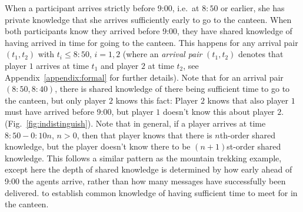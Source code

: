 When a participant arrives strictly before 9:00, i.e.\ at $8{:}50$ or earlier, she has private knowledge that she arrives sufficiently early to go to the canteen. When both participants know they arrived before 9:00, they have shared knowledge of having arrived in time for going to the canteen. This happens for any arrival pair $(t_1,t_2)$ with $t_i \leq 8{:}50$, $i=1,2$ (where an \emph{arrival pair} $(t_1,t_2)$ denotes that player $1$ arrives at time $t_1$ and player $2$ at time $t_2$, see Appendix~\ref{appendix:formal} for further details). Note that for an arrival pair $(8{:}50,8{:}40)$, there is shared knowledge of there being sufficient time to go to the canteen, but only player $2$ knows this fact: Player $2$ knows that also player $1$ must have arrived before 9{:}00, but player $1$ doesn't know this about player $2$.  (Fig.~\ref{fig:indistinguish}). Note that in general, if a player arrives at time $8{:}50-0{:}10n$, $n>0$, then that player knows that there is $n$th-order shared knowledge, but the player doesn't know there to be $(n+1)$st-order shared knowledge. This follows a similar pattern as the mountain trekking example, except here the depth of shared knowledge is determined by how early ahead of 9:00 the agents arrive, rather than how many messages have successfully been delivered.  to establish common knowledge of having sufficient time to meet for  in the canteen. 

